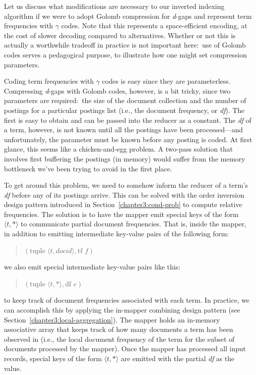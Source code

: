 Let us discuss what modifications are necessary to our inverted
indexing algorithm if we were to adopt Golomb compression for \emph{
  d}-gaps and represent term frequencies with $\gamma$ codes.  Note
that this represents a space-efficient encoding, at the cost of slower
decoding compared to alternatives.  Whether or not this is actually a
worthwhile tradeoff in practice is not important here:\ use of Golomb
codes serves a pedagogical purpose, to illustrate how one might set
compression parameters.

Coding term frequencies with $\gamma$ codes is easy since they are
parameterless.  Compressing \emph{d}-gaps with Golomb codes, however,
is a bit tricky, since two parameters are required:\ the size of the
document collection and the number of postings for a particular
postings list (i.e., the document frequency, or \emph{df}).  The first
is easy to obtain and can be passed into the reducer as a constant.
The \emph{df} of a term, however, is not known until all the postings
have been processed---and unfortunately, the parameter must be known
before any posting is coded.  At first glance, this seems like a
chicken-and-egg problem.  A two-pass solution that involves first
buffering the postings (in memory) would suffer from the memory
bottleneck we've been trying to avoid in the first place.

To get around this problem, we need to somehow inform the reducer of a
term's \emph{df} before any of its postings arrive.  This can be solved
with the order inversion design pattern introduced in
Section~\ref{chapter3:cond-prob} to compute relative frequencies.  The
solution is to have the mapper emit special keys of the form $\langle
t, \ast \rangle$ to communicate partial document frequencies.  That
is, inside the mapper, in addition to emitting intermediate key-value
pairs of the following form:

\begin{quote}
$(\textrm{tuple }\langle t, docid \rangle, \textrm{tf }f )$
\end{quote}

\noindent we also emit special intermediate key-value pairs like this:

\begin{quote}
$(\textrm{tuple }\langle t, \ast \rangle, \textrm{df }e )$
\end{quote}

\noindent to keep track of document frequencies associated with each
term.  In practice, we can accomplish this by applying the in-mapper
combining design pattern (see
Section~\ref{chapter3:local-aggregation}).  The mapper holds an
in-memory associative array that keeps track of how many documents a
term has been observed in (i.e., the local document frequency of the
term for the subset of documents processed by the mapper).  Once the
mapper has processed all input records, special keys of the form
$\langle t, \ast \rangle$ are emitted with the partial \emph{df} as the
value.

